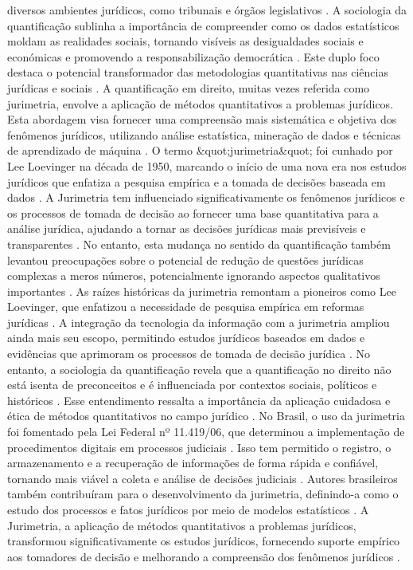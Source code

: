 \begin{agradecimentos}
diversos ambientes jurídicos, como tribunais e órgãos legislativos \cite{nunes2018}. A sociologia da quantificação sublinha a importância de compreender como os dados estatísticos moldam as realidades sociais, tornando visíveis as desigualdades sociais e económicas e promovendo a responsabilização democrática \cite{saltelli2020,demortain2019}. Este duplo foco destaca o potencial transformador das metodologias quantitativas nas ciências jurídicas e sociais \cite{paiva2021,camargo2021}. A quantificação em direito, muitas vezes referida como jurimetria, envolve a aplicação de métodos quantitativos a problemas jurídicos. Esta abordagem visa fornecer uma compreensão mais sistemática e objetiva dos fenômenos jurídicos, utilizando análise estatística, mineração de dados e técnicas de aprendizado de máquina \cite{1023071190721}. O termo &quot;jurimetria&quot; foi cunhado por Lee Loevinger na década de 1950, marcando o início de uma nova era nos estudos jurídicos que enfatiza a pesquisa empírica e a tomada de decisões baseada em dados \cite{1023071190721}. A Jurimetria tem influenciado significativamente os fenômenos jurídicos e os processos de tomada de decisão ao fornecer uma base quantitativa para a análise jurídica, ajudando a tornar as decisões jurídicas mais previsíveis e transparentes \cite{ribeiro2021quantification}. No entanto, esta mudança no sentido da quantificação também levantou preocupações sobre o potencial de redução de questões jurídicas complexas a meros números, potencialmente ignorando aspectos qualitativos importantes \cite{ribeiro2021quantification}. As raízes históricas da jurimetria remontam a pioneiros como Lee Loevinger, que enfatizou a necessidade de pesquisa empírica em reformas jurídicas \cite{1023071190721}. A integração da tecnologia da informação com a jurimetria ampliou ainda mais seu escopo, permitindo estudos jurídicos baseados em dados e evidências que aprimoram os processos de tomada de decisão jurídica \cite{10.1007/s11186-021-09453-1,unger2021process}. No entanto, a sociologia da quantificação revela que a quantificação no direito não está isenta de preconceitos e é influenciada por contextos sociais, políticos e históricos \cite{10.1590/dados.2022.65.3.267,10.1007/978-3-319-44000-215} . Esse entendimento ressalta a importância da aplicação cuidadosa e ética de métodos quantitativos no campo jurídico \cite{smith2021}. No Brasil, o uso da jurimetria foi fomentado pela Lei Federal nº 11.419/06, que determinou a implementação de procedimentos digitais em processos judiciais \cite{103390fi9040068}. Isso tem permitido o registro, o armazenamento e a recuperação de informações de forma rápida e confiável, tornando mais viável a coleta e análise de decisões judiciais \cite{103390fi9040068}. Autores brasileiros também contribuíram para o desenvolvimento da jurimetria, definindo-a como o estudo dos processos e fatos jurídicos por meio de modelos estatísticos \cite{silva2023role}. A Jurimetria, a aplicação de métodos quantitativos a problemas jurídicos, transformou significativamente os estudos jurídicos, fornecendo suporte empírico aos tomadores de decisão e melhorando a compreensão dos fenômenos jurídicos \cite{103390fi9040068}. 
    

\end{agradecimentos}
